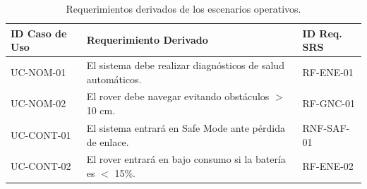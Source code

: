 \begin{table}[H]
	\centering
	\caption{Requerimientos derivados de los escenarios operativos.}
	\begin{tabularx}{\textwidth}{l X l}
		\toprule
		\textbf{ID Caso de Uso} & \textbf{Requerimiento Derivado}                             & \textbf{ID Req. SRS} \\
		\midrule
		UC-NOM-01               & El sistema debe realizar diagnósticos de salud automáticos. & RF-ENE-01            \\
		UC-NOM-02               & El rover debe navegar evitando obstáculos $>$ 10 cm.        & RF-GNC-01            \\
		UC-CONT-01              & El sistema entrará en Safe Mode ante pérdida de enlace.     & RNF-SAF-01           \\
		UC-CONT-02              & El rover entrará en bajo consumo si la batería es $<$ 15\%. & RF-ENE-02            \\
		\bottomrule
	\end{tabularx}
\end{table}
